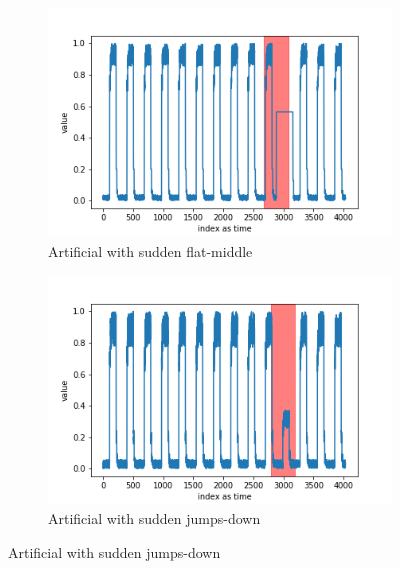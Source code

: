 \documentclass[12pt]{article}
\begin{document}
\begin{figure}[H]
  \begin{subfigure}[t]{0.5\textwidth}
    \centering
    \includegraphics[width=\linewidth]{images/dataAnomalies/artificial/art_daily_flatmiddle.png}
    \caption{Artificial with sudden flat-middle}
  \end{subfigure}
  \hfill
  \begin{subfigure}[t]{0.5\textwidth}
    \centering
    \includegraphics[width=\linewidth]{images/dataAnomalies/artificial/art_daily_jumpsdown.png}
    \caption{Artificial with sudden jumps-down}
  \end{subfigure}

  \medskip


\end{figure}
\end{document}
